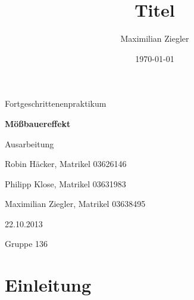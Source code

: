 \documentclass[a4paper, 10pt]{scrreprt}
\author{Maximilian Ziegler}
\title{Titel}
\date{\today}
\begin{document}
\begin{titlepage}
\clearpage \thispagestyle{empty} \setcounter{page}{0}

\begin{center}
\begin{figure}[h]
\centering

\end{figure}
\vspace{1.5cm}

%



%
{\centering
	{\huge 


		Fortgeschrittenenpraktikum							\\
		\vspace{2cm}
		
		{\bf	Mößbauereffekt	}										\\
		\vspace{1.5cm}
		
		Ausarbeitung												\\
		\vspace{1cm}
		
		Robin Häcker, Matrikel 03626146						\\
		\vspace{1cm}
		
		Philipp Klose, Matrikel 03631983						\\
		\vspace{1cm}
		
		Maximilian Ziegler, Matrikel 03638495						\\
		\vspace{1cm}
		
		22.10.2013												\\
		\vspace{1cm}
		
		Gruppe 136													\\
	}}
\end{center}
\end{titlepage}
%
\clearpage \thispagestyle{empty} \setcounter{page}{0}
\newpage \thispagestyle{empty}
\tableofcontents
\newpage

\chapter{Einleitung}
\label{cha:Einleitung}
\end{document}
